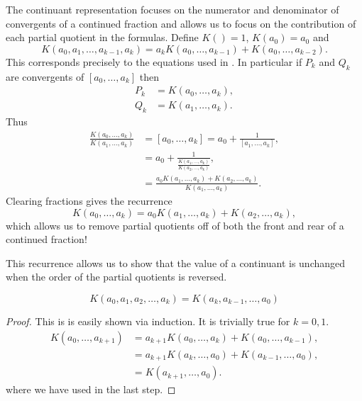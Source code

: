 The continuant representation focuses on the numerator and denominator
of convergents of a continued fraction and allows us to focus on the
contribution of each partial quotient in the formulas.  Define $K() =
1$, $K(a_0) = a_0$ and
\[
K(a_0, a_1, \ldots, a_{k-1}, a_k) = a_k K(a_0, \ldots, a_{k-1}) +
K(a_0, \ldots, a_{k-2}).
\]
This corresponds precisely to the equations used in
.  In particular if $P_k$ and $Q_k$ are
convergents of $[a_0, \ldots, a_k]$ then
\[
\begin{aligned}
P_k & = K(a_0, \ldots, a_k), \\
Q_k & = K(a_1, \ldots, a_k).
\end{aligned}
\]
Thus 
\[
\begin{aligned}
\displaystyle
\frac{K(a_0, \ldots, a_k)}{K(a_1, \ldots, a_k)} 
  &\displaystyle = [a_0, \ldots, a_k] = a_0 + \frac{1}{[a_1, \ldots, a_k]}, \\
  & \displaystyle = a_0 + \frac{1}{\displaystyle \frac{K(a_1, \ldots, a_k)}{K(a_2,
                \ldots, a_k)}}, \\
  & \displaystyle = \frac{a_0 K(a_1, \ldots, a_k) + K(a_2, \ldots,
                a_k)}{K(a_1, \ldots, a_k)}.
\end{aligned}
\]
Clearing fractions gives the recurrence
\begin{equation}\label{ContinuantRev:Eq}
K(a_0, \ldots, a_k) = a_0 K(a_1, \ldots, a_k) + K(a_2, \ldots, a_k), 
\end{equation}
which allows us to remove partial quotients off of both the front and
rear of a continued fraction!

This recurrence allows us to show that the value of a continuant is
unchanged when the order of the partial quotients is reversed.

\begin{proposition} \label{CF:Symmetric:Prop}
\[
K(a_0, a_1, a_2, \ldots, a_k) = 
K(a_k, a_{k-1}, \ldots,  a_0)
\]
\end{proposition}

\begin{proof}
This is is easily shown via induction.  It is trivially true for $k =
0, 1$.
\[
\begin{aligned}
 K(a_0, \ldots, a_{k+1}) 
    & = a_{k+1} K(a_0, \ldots, a_k) + K(a_0, \ldots, a_{k-1}), \\
    & = a_{k+1} K(a_k, \ldots, a_0) + K(a_{k-1}, \ldots, a_0), \\
    & = K(a_{k+1}, \ldots, a_0).
\end{aligned}
\]
where we have used  in the last step.
\end{proof}

